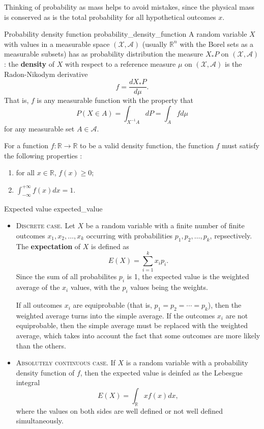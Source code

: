 Thinking of probability as mass helps to avoid mistakes, since the physical mass is conserved as is the total probability for all hypothetical outcomes $x$.

\begin{definition}{Probability density function \cite{wikipedia_probability_density_function}}{probability_density_function}
	A random variable $X$ with values in a measurable space $(\mathcal{X}, \mathcal{A})$ (usually $\mathbb{R}^n$ with the Borel sets as a measurable subsets) has as probability distribution the measure $X_* P$ on $(\mathcal{X}, \mathcal{A})$: the \textbf{density} of $X$ with respect to a reference measure $\mu$ on $(\mathcal{X}, \mathcal{A})$ is the Radon-Nikodym derivative
	$$ f = \dfrac{dX_* P}{d \mu} . $$
	That is, $f$ is any measurable function with the property that
	$$ P(X \in A) = \int_{X^{-1}A} dP = \int_A f d\mu $$
	for any measurable set $A \in \mathcal{A}$.
\end{definition}

For a function $f : \mathbb{R} \to \mathbb{R}$ to be a valid density function, the function $f$ must satisfy the following properties \cite{math2901_notes}:
\begin{enumerate}
	\item for all $x \in \mathbb{R}$, $f(x) \geq 0$;
	\item $\int_{-\infty}^{+\infty} f(x) dx = 1$.
\end{enumerate}

\begin{definition}{Expected value \cite{wikipedia_expected_value}}{expected_value}
	\begin{itemize}

		\item \textsc{Discrete case.} Let $X$ be a random variable with a finite number of finite outcomes $x_1, x_2, \ldots, x_k$ occurring with probabilities $p_1, p_2, \ldots, p_k$, repsectively. The \textbf{expectation} of $X$ is defined as
		$$ E(X) = \sum_{i=1}^k x_i p_i. $$
		Since the sum of all probabilites $p_i$ is 1, the expected value is the weighted average of the $x_i$ values, with the $p_i$ values being the weights.
	
		If all outcomes $x_{i}$ are equiprobable (that is, $p_{1} = p_{2} = \cdots = p_{k}$), then the weighted average turns into the simple average. If the outcomes $x_{i}$ are not equiprobable, then the simple average must be replaced with the weighted average, which takes into account the fact that some outcomes are more likely than the others.
		
		\item \textsc{Absolutely continuous case.} If $X$ is a random variable with a probability density function of $f$, then the expected value is deinfed as the Lebesgue integral
		$$ E(X) = \int_{\mathbb{R}} x f(x) dx , $$
		where the values on both sides are well defined or not well defined simultaneously.

	\end{itemize}
\end{definition}

